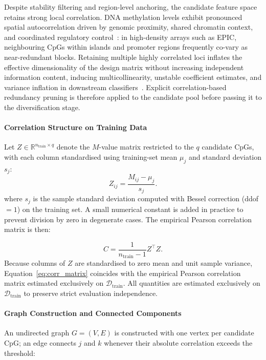 Despite stability filtering and region-level anchoring, the 
candidate feature space retains strong local correlation. DNA 
methylation levels exhibit pronounced spatial autocorrelation 
driven by genomic proximity, shared chromatin context, and 
coordinated regulatory control~\cite{Hansen2011, Aryee2014}: 
in high-density arrays such as EPIC, neighbouring CpGs within 
islands and promoter regions frequently co-vary as near-redundant 
blocks. Retaining multiple highly correlated loci inflates the 
effective dimensionality of the design matrix without increasing 
independent information content, inducing multicollinearity, 
unstable coefficient estimates, and variance inflation in 
downstream classifiers~\cite{Donoho2000, Hall2005}. Explicit 
correlation-based redundancy pruning is therefore applied to 
the candidate pool before passing it to the diversification 
stage.

\paragraph{Correlation Structure on Training Data}

Let $Z \in \mathbb{R}^{n_{\mathrm{train}} \times q}$ denote 
the $M$-value matrix restricted to the $q$ candidate CpGs, 
with each column standardised using training-set mean $\mu_j$ 
and standard deviation $s_j$:
\[
Z_{ij}
=
\frac{M_{ij} - \mu_j}{s_j}.
\]
where $s_j$ is the sample standard deviation computed with Bessel correction 
(ddof $=1$) on the training set. A small numerical constant is added in practice 
to prevent division by zero in degenerate cases.
The empirical Pearson correlation matrix is then:

\begin{equation}
C
=
\frac{1}{n_{\mathrm{train}} - 1}
Z^{\top} Z.
\label{eq:corr_matrix}
\end{equation}
Because columns of $Z$ are standardised to zero mean and unit sample variance, 
Equation~\eqref{eq:corr_matrix} coincides with the empirical Pearson 
correlation matrix estimated exclusively on $\mathcal{D}_{\mathrm{train}}$.
All quantities are estimated exclusively on 
$\mathcal{D}_{\mathrm{train}}$ to preserve strict 
evaluation independence.

\paragraph{Graph Construction and Connected Components}

An undirected graph $G = (V, E)$ is constructed with one 
vertex per candidate CpG; an edge connects $j$ and $k$ 
whenever their absolute correlation exceeds the threshold:

